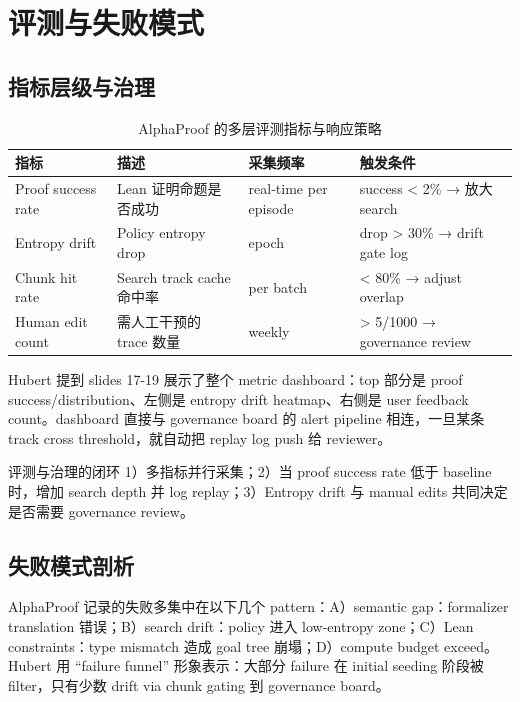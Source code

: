 \section{评测与失败模式}

\subsection{指标层级与治理}
\begin{table}[H]
\centering
\begin{tabular}{p{3.5cm}p{4cm}p{3.5cm}p{3cm}}
\toprule
指标 & 描述 & 采集频率 & 触发条件 \\
\midrule
Proof success rate & Lean 证明命题是否成功 & real-time per episode & success < 2\% → 放大 search \\
Entropy drift & Policy entropy drop & epoch & drop > 30\% → drift gate log \\
Chunk hit rate & Search track cache 命中率 & per batch & < 80\% → adjust overlap \\
Human edit count & 需人工干预的 trace 数量 & weekly & > 5/1000 → governance review \\
\bottomrule
\end{tabular}
\caption{AlphaProof 的多层评测指标与响应策略}
\end{table}

Hubert 提到 slides 17-19 展示了整个 metric dashboard：top 部分是 proof success/distribution、左侧是 entropy drift heatmap、右侧是 user feedback count。dashboard 直接与 governance board 的 alert pipeline 相连，一旦某条 track cross threshold，就自动把 replay log push 给 reviewer。

\begin{importantbox}{评测与治理的闭环}
1）多指标并行采集；2）当 proof success rate 低于 baseline 时，增加 search depth 并 log replay；3）Entropy drift 与 manual edits 共同决定是否需要 governance review。
\end{importantbox}

\subsection{失败模式剖析}
AlphaProof 记录的失败多集中在以下几个 pattern：A）semantic gap：formalizer translation 错误；B）search drift：policy 进入 low-entropy zone；C）Lean constraints：type mismatch 造成 goal tree 崩塌；D）compute budget exceed。Hubert 用 “failure funnel” 形象表示：大部分 failure 在 initial seeding 阶段被 filter，只有少数 drift via chunk gating 到 governance board。


